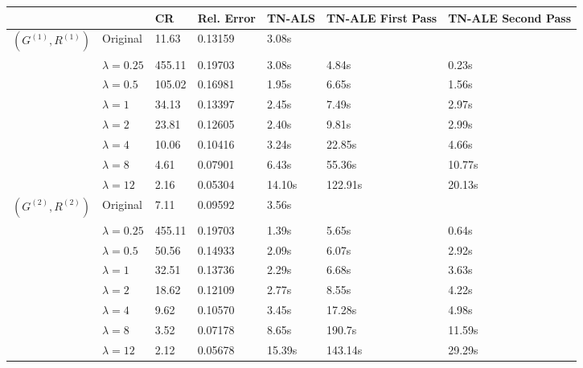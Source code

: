 \documentclass[11pt,a4paper,openright,oneside]{book}
\numberwithin{equation}{section}
\begin{document}
{\begin{figure}[h]
\begin{adjustwidth}{-30pt}{-30pt}
\begin{tabular}{lllllll}
\hline
                     &                  & CR     & Rel. Error & TN-ALS & TN-ALE First Pass & TN-ALE Second Pass \\ \hline
$(G^{(1)}, R^{(1)})$ & Original         & 11.63  & 0.13159    & 3.08s  &                   &                    \\
                     & $\lambda = 0.25$ & 455.11 & 0.19703    & 3.08s  & 4.84s             & 0.23s              \\
                     & $\lambda = 0.5$  & 105.02 & 0.16981    & 1.95s  & 6.65s             & 1.56s              \\
                     & $\lambda = 1$    & 34.13  & 0.13397    & 2.45s  & 7.49s             & 2.97s              \\
                     & $\lambda = 2$    & 23.81  & 0.12605    & 2.40s  & 9.81s             & 2.99s              \\
                     & $\lambda = 4$    & 10.06  & 0.10416    & 3.24s  & 22.85s            & 4.66s              \\
                     & $\lambda = 8$    & 4.61   & 0.07901    & 6.43s  & 55.36s            & 10.77s             \\
                     & $\lambda = 12$   & 2.16   & 0.05304    & 14.10s & 122.91s           & 20.13s             \\ \hline
$(G^{(2)}, R^{(2)})$ & Original         & 7.11   & 0.09592    & 3.56s  &                   &                    \\
                     & $\lambda = 0.25$ & 455.11 & 0.19703    & 1.39s  & 5.65s             & 0.64s              \\
                     & $\lambda = 0.5$  & 50.56  & 0.14933    & 2.09s  & 6.07s             & 2.92s              \\
                     & $\lambda = 1$    & 32.51  & 0.13736    & 2.29s  & 6.68s             & 3.63s              \\
                     & $\lambda = 2$    & 18.62  & 0.12109    & 2.77s  & 8.55s             & 4.22s              \\
                     & $\lambda = 4$    & 9.62   & 0.10570    & 3.45s  & 17.28s            & 4.98s              \\
                     & $\lambda = 8$    & 3.52   & 0.07178    & 8.65s  & 190.7s            & 11.59s             \\
                     & $\lambda = 12$   & 2.12   & 0.05678    & 15.39s & 143.14s           & 29.29s             \\ \hline

\end{tabular}
\end{adjustwidth}
\end{figure}}
\end{document}
